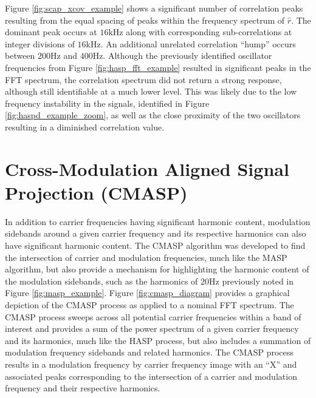 Figure \ref{fig:scap_xcov_example} shows a significant number of correlation peaks resulting from the equal spacing of peaks within the frequency spectrum of $\hat{r}$.  The dominant peak occurs at $16$kHz along with corresponding sub-correlations at integer divisions of $16$kHz.  An additional unrelated correlation ``hump'' occurs between $200$Hz and $400$Hz.  Although the previously identified oscillator frequencies from Figure \ref{fig:hasp_fft_example} resulted in significant peaks in the FFT spectrum, the correlation spectrum did not return a strong response, although still identifiable at a much lower level.   This was likely due to the low frequency instability in the signals, identified in Figure \ref{fig:haspd_example_zoom}, as well as the close proximity of the two oscillators resulting in a diminished correlation value.

\section[Cross-Modulation Aligned Signal Projection (CMASP)]{Cross-Modulation Aligned Signal Projection (CMASP)}
\label{Cross-Modulation Aligned Signal Projection}

In addition to carrier frequencies having significant harmonic content, modulation sidebands around a given carrier frequency and its respective harmonics can also have significant harmonic content.  The CMASP algorithm was developed to find the intersection of carrier and modulation frequencies, much like the MASP algorithm, but also provide a mechanism for highlighting the harmonic content of the modulation sidebands, such as the harmonics of $20$Hz previously noted in Figure \ref{fig:masp_example}.  Figure \ref{fig:cmasp_diagram} provides a graphical depiction of the CMASP process as applied to a nominal FFT spectrum.   The CMASP process sweeps across all potential carrier frequencies within a band of interest and provides a sum of the power spectrum of a given carrier frequency and its harmonics, much like the HASP process, but also includes a summation of modulation frequency sidebands and related harmonics.  The CMASP process results in a modulation frequency by carrier frequency image with an ``X'' and associated peaks corresponding to the intersection of a carrier and modulation frequency and their respective harmonics.

